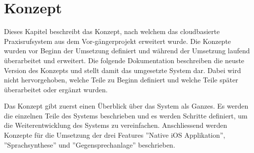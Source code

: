 \section{Konzept}

Dieses Kapitel beschreibt das Konzept, nach welchem das cloudbasierte Praxisrufsystem aus dem Vor-gängerprojekt erweitert wurde.
Die Konzepte wurden vor Beginn der Umsetzung definiert und während der Umsetzung laufend überarbeitet und erweitert.
Die folgende Dokumentation beschreiben die neuste Version des Konzepts und stellt damit das umgesetzte System dar.
Dabei wird nicht hervorgehoben, welche Teile zu Beginn definiert und welche Teile später überarbeitet oder ergänzt wurden.

Das Konzept gibt zuerst einen Überblick über das System als Ganzes.
Es werden die einzelnen Teile des Systems beschrieben und es werden Schritte definiert, um die Weiterentwicklung des Systems zu vereinfachen.
Anschliessend werden Konzepte für die Umsetzung der drei Features ''Native iOS Applikation'', ''Sprachsynthese'' und ''Gegensprechanlage'' beschrieben.





